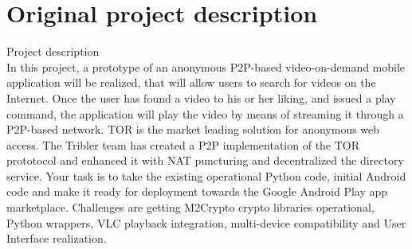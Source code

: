 \chapter{Original project description}
\label{chp:originaldescription}

	Project description\cite{originalprojectdescription}\\
	
	In this project, a prototype of an anonymous P2P-based video-on-demand mobile application will be realized, that will allow users to search for videos on the Internet. Once the user has found a video to his or her liking, and issued a play command, the application will play the video by means of streaming it through a P2P-based network. TOR is the market leading solution for anonymous web access. The Tribler team has created a P2P implementation of the TOR prototocol and enhanced it with NAT puncturing and decentralized the directory service. Your task is to take the existing operational Python code, initial Android code and make it ready for deployment towards the Google Android Play app marketplace. Challenges are getting M2Crypto crypto libraries operational, Python wrappers, VLC playback integration, multi-device compatibility and User Interface realization.\\
	